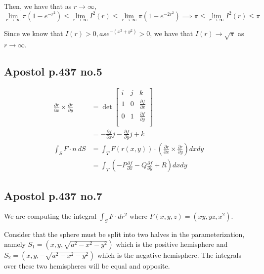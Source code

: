\documentclass[12pt,letterpaper]{article}
\theoremstyle{definition}
\begin{document}
Then, we have that as $r\rightarrow \infty$,
\[
  \lim_{r\rightarrow \infty}\pi(1-e^{-r^2}) \leq \lim_{r\rightarrow \infty}I^2(r) \leq
  \lim_{r\rightarrow \infty}\pi(1-e^{-2r^2}) \implies \pi \leq
  \lim_{r\rightarrow \infty}I^2(r) \leq \pi
\]

Since we know that $I(r) > 0, as e^{-(x^2+y^2)} > 0$, we have that $I(r)
\rightarrow \sqrt{\pi}$ as $r \rightarrow \infty$.

\subsection*{Apostol p.437 no.5}

\begin{align*}
  \frac{\partial r}{\partial x} \times \frac{\partial r}{\partial y} &= \det
                                                                       \begin{bmatrix}
                                                                         i & j & k \\
                                                                         1 & 0 & \frac{\partial f}{\partial x} \\
                                                                         0 & 1 & \frac{\partial f}{\partial y} \\
                                                                       \end{bmatrix} \\
                                                                     &= -\frac{\partial f}{\partial x}j - \frac{\partial f}{\partial y}j + k \\
  \int_S F \cdot n\ dS &= \int_TF(r(x,y)) \cdot \left( \frac{\partial r}{\partial x} \times \frac{\partial r}{\partial y}  \right)dxdy \\
                       &= \int_T(-P\frac{\partial f}{\partial x} - Q\frac{\partial f}{\partial y} + R) dxdy
\end{align*}


\subsection*{Apostol p.437 no.7}

We are computing the integral $\int_SF \cdot dr^2$ where $F(x,y,z) = (xy, yz, x^2)$.

Consider that the sphere must be split into two halves in the parameterization,
namely $S_1 = (x,y,\sqrt{a^2-x^2-y^2})$ which is the positive hemisphere and
$S_2 = (x,y, -\sqrt{a^2-x^2-y^2})$ which is the negative hemisphere. The
integrals over these two hemispheres will be equal and opposite.
\end{document}
